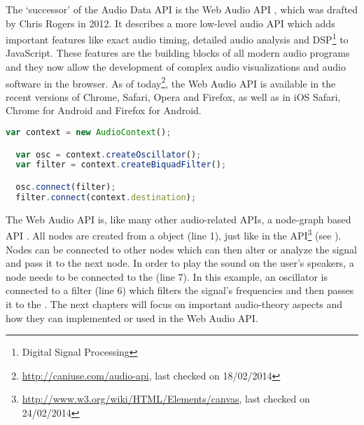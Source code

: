 The `successor' of the Audio Data API is the Web Audio API \cite{wilson2014webaudiospec}, which was drafted by Chris Rogers in 2012. It describes a more low-level audio API which adds important features like exact audio timing, detailed audio analysis and DSP\footnote{Digital Signal Processing} to JavaScript. These features are the building blocks of all modern audio programs and they now allow the development of complex audio visualizations and audio software in the browser. As of today\footnote{\url{http://caniuse.com/audio-api}, last checked on 18/02/2014}, the Web Audio API is available in the recent versions of Chrome, Safari, Opera and Firefox, as well as in iOS Safari, Chrome for Android and Firefox for Android.

\begin{lstlisting}[language=JavaScript, caption=Simple node graph in the Web Audio API, label=lst:webaudio-simple]
  var context = new AudioContext();

  var osc = context.createOscillator();
  var filter = context.createBiquadFilter();

  osc.connect(filter);
  filter.connect(context.destination);
\end{lstlisting}

The Web Audio API is, like many other audio-related APIs, a node-graph based API \cite[chapter: 1.1]{smus2013webaudio}. All nodes are created from a  object (line 1), just like in the  API\footnote{\url{http://www.w3.org/wiki/HTML/Elements/canvas}, last checked on 24/02/2014} (see ). Nodes can be connected to other nodes which can then alter or analyze the signal and pass it to the next node. In order to play the sound on the user's speakers, a node needs to be connected to the  (line 7). In this example, an oscillator is connected to a filter (line 6) which filters the signal's frequencies and then passes it to the . The next chapters will focus on important audio-theory aspects and how they can implemented or used in the Web Audio API.